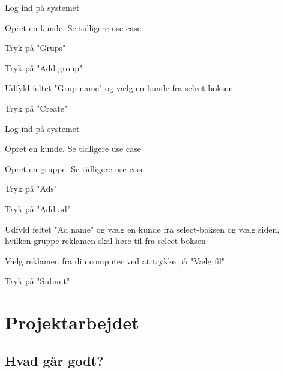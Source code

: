 \documentclass[a4paper,12pt]{article}
\begin{document}
\begin{usecase}
 {
	\item Log ind på systemet
	\item Opret en kunde. Se tidligere use case
	\item Tryk på "Grups"
	\item Tryk på "Add group"
	\item Udfyld feltet "Grup name" og vælg en kunde fra select-boksen
	\item Tryk på "Create"
}
\end{usecase}

\begin{usecase}
 {
	\item Log ind på systemet
	\item Opret en kunde. Se tidligere use case
	\item Opret en gruppe. Se tidligere use case
	\item Tryk på "Ads"
	\item Tryk på "Add ad"
	\item Udfyld feltet "Ad name" og vælg en kunde fra select-boksen og vælg siden, hvilken gruppe reklamen skal høre til fra select-boksen
	\item Vælg reklamen fra din computer ved at trykke på "Vælg fil"
	\item Tryk på "Submit"
}
\end{usecase}

\section{Projektarbejdet}
\subsection{Hvad går godt?}
\end{document}
